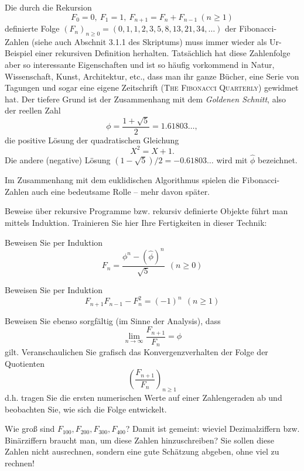 
Die durch die Rekursion
\[
F_0=0,~ F_1=1,~ F_{n+1}=F_n+F_{n-1}~(n \geq 1)
\]
definierte Folge
$
(F_n)_{n \geq 0} = (0,1,1,2,3,5,8,13,21,34,\ldots)
$
der {\sc Fibonacci}-Zahlen (siehe auch Abschnit 3.1.1 des Skriptums)
muss immer wieder als Ur-Beispiel einer rekursiven Definition herhalten.
Tatsächlich hat diese Zahlenfolge aber so interessante Eigenschaften und ist
so häufig vorkommend in Natur, Wissenschaft, Kunst, Architektur, etc., dass
man ihr ganze Bücher, eine Serie von Tagungen und sogar eine eigene Zeitschrift 
(\textsc {The Fibonacci Quarterly}) gewidmet hat.
Der tiefere Grund ist der Zusammenhang mit dem \textit{Goldenen Schnitt},
also der reellen Zahl
\[
\phi = \frac{1 + \sqrt{5}}{2} = 1.61803\ldots,
\]
die positive Lösung der quadratischen Gleichung
\[
X^2=X+1.
\]
Die andere (negative) Lösung $(1-\sqrt{5})/2 = -0.61803\ldots$ wird mit
$\widehat{\phi}$ bezeichnet.

Im Zusammenhang mit dem euklidischen Algorithmus spielen die
{\sc Fibonacci}-Zahlen auch eine bedeutsame Rolle -- mehr davon später.

Beweise über rekursive Programme bzw. rekursiv definierte Objekte führt man
mittels Induktion. Trainieren Sie hier Ihre Fertigkeiten in dieser Technik:

\begin{flushenum}
\item Beweisen Sie per Induktion
\[
F_n = \frac{\phi^n - (\widehat{\phi})^n}{\sqrt{5}}~~(n \geq 0) 
 \]
\item Beweisen Sie per Induktion
 \[
F_{n+1} F_{n-1} - F_n^2 = (-1)^n~~(n \geq 1)
\]
\item Beweisen Sie ebenso sorgf\"altig (im Sinne der Analysis), dass
\[
\lim_{n \rightarrow \infty} \frac{F_{n+1}}{F_n} = \phi
\]
gilt. Veranschaulichen Sie grafisch das Konvergenzverhalten der Folge der
Quotienten
\[
\left(\frac{F_{n+1}}{F_n}\right)_{n \geq 1}
\]
d.h. tragen Sie die ersten numerischen Werte auf einer Zahlengeraden ab und
beobachten Sie, wie sich die Folge entwickelt.

\item
Wie groß sind $F_{100}, F_{200}, F_{300}, F_{400}$? Damit ist gemeint: wieviel
Dezimalziffern bzw. Bin\"arziffern braucht man, um diese Zahlen hinzuschreiben?
Sie sollen diese Zahlen nicht ausrechnen, sondern eine gute Sch\"atzung abgeben,
ohne viel zu rechnen!
\end{flushenum}



